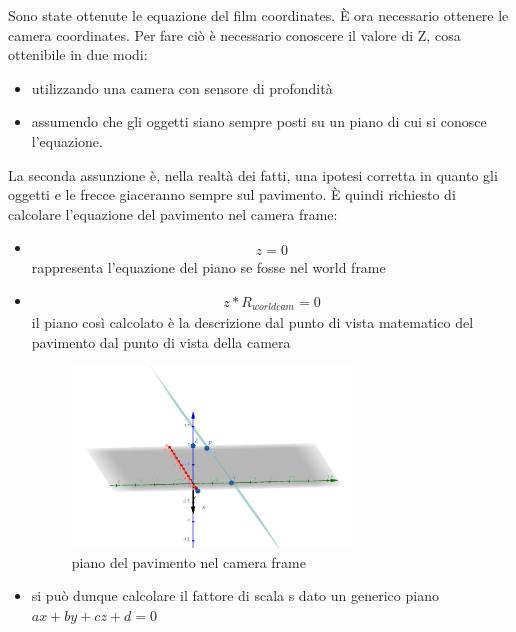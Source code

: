 Sono state ottenute le equazione del film coordinates. È ora necessario ottenere le camera coordinates. Per fare ciò è necessario conoscere il valore di Z, cosa ottenibile in due modi:
\begin{itemize}
	\item \textbf{} utilizzando una camera con sensore di profondità
	\item \textbf{} assumendo che gli oggetti siano sempre posti su un piano di cui si conosce l'equazione.
\end{itemize}
La seconda assunzione è, nella realtà dei fatti, una ipotesi corretta in quanto gli oggetti e le frecce giaceranno sempre sul pavimento.
È quindi richiesto di calcolare l'equazione del pavimento nel camera frame:
\begin{itemize}
	\item \textbf{}
		\begin{equation}
			\begin{split}
			z = 0
			\end{split}
		\end{equation}
		rappresenta l'equazione del piano se fosse nel world frame
	\item \textbf{}
		\begin{equation}
		\begin{split}
		z*R_{worldcam} = 0
		\end{split}
		\end{equation}
		il piano così calcolato è la descrizione dal punto di vista matematico del pavimento dal punto di vista della camera
	\begin{figure}[H]
		\centering
		\includegraphics[width=0.7\textwidth]{Immagini/piano_camera.jpeg}
		\caption{piano del pavimento nel camera frame}
		\label{fig:piano_camera}
	\end{figure}
	\item \textbf{}
	si può dunque calcolare il fattore di scala s dato un generico piano $ax+by+cz+d=0$

\end{itemize}
